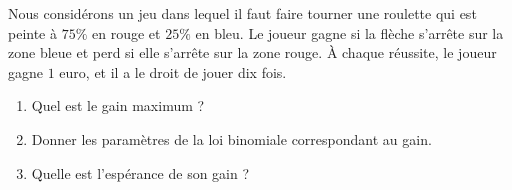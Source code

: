 
\begin{exercice}\label{exoPremiere-0094}

    \begin{multicols}{2}
   Nous considérons un jeu dans lequel il faut faire tourner une roulette qui est peinte à \( 75\%\) en rouge et \( 25\%\) en bleu.  Le joueur gagne si la flèche s'arrête sur la zone bleue et perd si elle s'arrête sur la zone rouge. À chaque réussite, le joueur gagne \( 1\) euro, et il a le droit de jouer dix fois.

   \begin{enumerate}
       \item
           Quel est le gain maximum ?
       \item
           Donner les paramètres de la loi binomiale correspondant au gain.
       \item
           Quelle est l'espérance de son gain ?
   \end{enumerate}

\columnbreak

\begin{center}

\end{center}

    \end{multicols}

\end{exercice}
